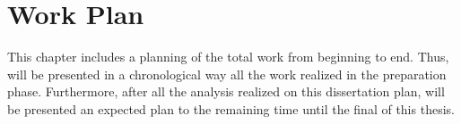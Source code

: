 \chapter{Work Plan}
\label{cha:work_plan}
This chapter includes a planning of the total work from beginning to end. 
Thus, will be presented in a chronological way all the work realized in the 
preparation phase. Furthermore, after all the analysis realized on this 
dissertation plan, will be presented an expected plan to the remaining 
time until the final of this thesis.
